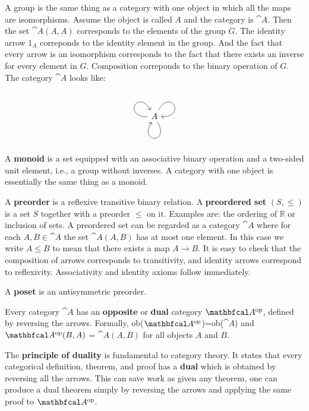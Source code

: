 \documentclass[11pt,a4paper]{article}
\begin{document}
A group is the same thing as a category with one object in which all the maps are isomorphisms. Assume the object is called $A$ and the category is $\cat{A}$. Then the set $\cat{A}(A,A)$ corresponds to the elements of the group $G$. The identity arrow $1_A$ correponds to the identity element in the group. And the fact that every arrow is an isomorphism corresponds to the fact that there exists an inverse for every element in $G$. Composition correponds to the binary operation of $G$. The category $\cat{A}$ looks like:
\begin{equation*}
\begin{tikzcd}
    A \arrow[in=0, out=60, distance=3em, ""]
    \arrow[in=120, out=180, distance=3em, ""]
    \arrow[in=240, out=300, distance=3em, ""]
\end{tikzcd}
\end{equation*}

A \textbf{monoid} is a set equipped with an associative binary operation and a two-sided unit element, i.e., a group without inverses. A category with one object is essentially the same thing as a monoid.

A \textbf{preorder} is a reflexive transitive binary relation. A \textbf{preordered set} $(S,\leq)$ is a set $S$ together with a preorder $\leq$ on it. Examples are: the ordering of $\mathbb{R}$ or inclusion of sets.
A preordered set can be regarded as a category $\cat{A}$ where for each $A,B\in \cat{A}$ the set $\cat{A}(A,B)$ has at most one element. In this case we write $A\leq B$ to mean that there exists a map $A\to B$. It is easy to check that the composition of arrows corresponds to transitivity, and identity arrows correspond to reflexivity. Associativity and identity axioms follow immediately.

A \textbf{poset} is an antisymmetric preorder.\bigskip

Every category $\cat{A}$ has an \textbf{opposite}  or \textbf{dual} category $\catop{A}$, defined by reversing the arrows. Formally, ob($\catop{A}$)=ob($\cat{A}$) and $\catop{A}(B,A)$ = $\cat{A}(A,B)$ for all objects $A$ and $B$.

\begin{remark}
    The \textbf{principle of duality} is fundamental to category theory. It states that every categorical definition, theorem, and proof has a \textbf{dual} which is obtained by reversing all the arrows. This can save work as given any theorem, one can produce a dual theorem simply by reversing the arrows and applying the same proof to $\catop{A}$.
\end{remark}
\end{document}
